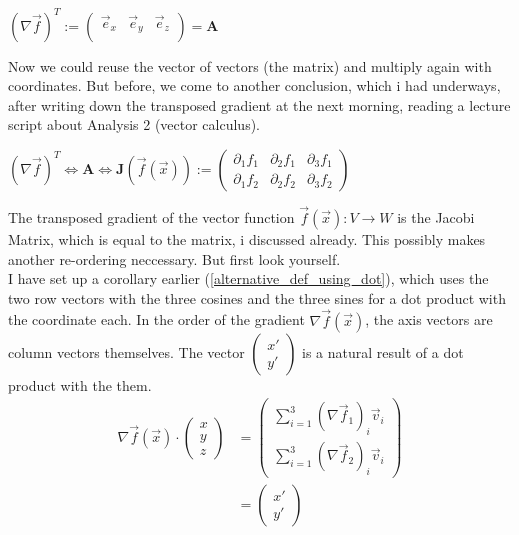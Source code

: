 \documentclass[a4paper]{article}
\begin{document}
\begin{center}
$(\nabla\vec{f})^{T} := \begin{pmatrix}\vec{e}_{x} & \vec{e}_{y} &\vec{e}_{z}\\\end{pmatrix} = \boldsymbol{A} $
\end{center}

Now we could reuse the vector of vectors (the matrix) and multiply again with coordinates. But before, we come to another conclusion, which i had underways, after writing down the transposed gradient at the next morning, reading a lecture script about Analysis 2 (vector calculus).\\

\begin{center}
$(\nabla\vec{f})^{T} \Leftrightarrow  \boldsymbol{A}  \Leftrightarrow \boldsymbol{J}(\vec{f}(\vec{x})) := \begin{pmatrix}\partial_{1}f_{1} & \partial_{2}f_{1} & \partial_{3}f_{1}\\\partial_{1}f_{2} & \partial_{2}f_{2} & \partial_{3}f_{2}\end{pmatrix}$
\end{center}

The transposed gradient of the vector function $\vec{f}(\vec{x}) : V \rightarrow W$ is the Jacobi Matrix, which is equal to the matrix, i discussed already. This possibly makes another re-ordering neccessary. But first look yourself.\\

I have set up a corollary earlier (\ref{alternative_def_using_dot}), which uses the two row vectors with the three cosines and the three sines for a dot product with the coordinate each. In the order of the gradient $\nabla\vec{f}(\vec{x})$, the axis vectors are column vectors themselves. The vector $\begin{pmatrix}x'\\y'\end{pmatrix}$ is a natural result of a dot product with the them.\\

\begin{displaymath}
\begin{align}
\nabla\vec{f}(\vec{x}) \cdot \begin{pmatrix}x\\y\\z\end{pmatrix} &= \begin{pmatrix}\sum_{i=1}^{3}(\nabla\vec{f}_{1})_{i}\vec{v}_{i}\\\sum_{i=1}^{3}(\nabla\vec{f}_{2})_{i}\vec{v}_{i}\end{pmatrix}\\ &= \begin{pmatrix}x'\\y'\end{pmatrix}
\end{align}
\end{displaymath}
\end{document}

